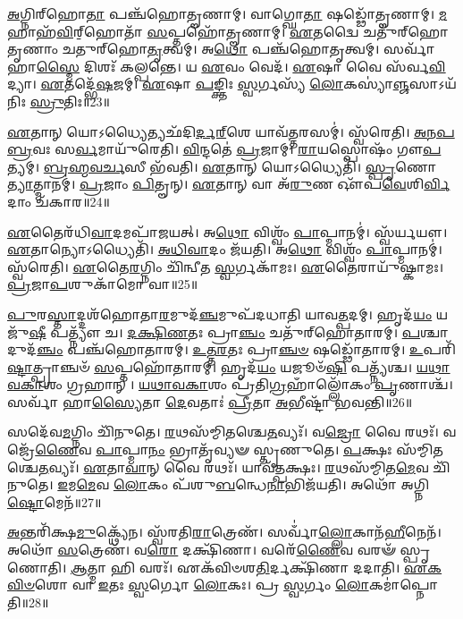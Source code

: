    \ul{𑌅}\-𑌗𑍍𑌨𑌿𑌰𑍍‌𑌹𑍋\-\ul{𑌤𑌾} 𑌪𑌞𑍍𑌚᳴𑌹𑍋𑌤𑍄𑌣𑌾𑌮𑍍।
   𑌵𑌾𑌗𑍍𑌘𑍋\-\ul{𑌤𑌾} 𑌷𑌡𑍍𑌢𑍋᳴𑌤𑍄𑌣𑌾𑌮𑍍।
   \ul{𑌮}\-𑌹𑌾𑌹᳴\-\ul{𑌵𑌿}\-𑌰𑍍‌॒𑌹𑍋𑌤𑌾᳴ \ul{𑌸}\-𑌪𑍍𑌤𑌹𑍋᳴𑌤𑍄𑌣𑌾𑌮𑍍।
   \ul{𑌏}\-𑌤𑌦𑍍𑌵𑍈 𑌚𑌤𑍁᳴𑌰𑍍‌𑌹𑍋𑌤𑍃𑌣𑌾𑌂 𑌚𑌤𑍁𑌰𑍍‌𑌹𑍋\-\ul{𑌤𑍃}\-𑌤𑍍𑌵𑌮𑍍।
   𑌅\-\ul{𑌥𑍋} 𑌪𑌞𑍍𑌚᳴𑌹𑍋𑌤𑍃𑌤𑍍𑌵𑌮𑍍।
   𑌸𑌰𑍍𑌵𑌾᳴ 𑌹𑌾\-\ul{𑌸𑍍𑌮𑍈} 𑌦𑌿𑌶𑌃᳴ 𑌕𑌲𑍍𑌪𑌨𑍍𑌤𑍇।
   𑌯 \ul{𑌏}\-𑌵𑌂 𑌵𑍇𑌦᳴।
   \ul{𑌏}\-𑌷𑌾 𑌵𑍈 𑌸᳴𑌰𑍍𑌵\-\ul{𑌵𑌿}\-𑌦𑍍𑌯𑌾।
   \ul{𑌏}\-𑌤𑌦𑍍𑌭𑍇᳴\-\ul{𑌷}\-𑌜𑌮𑍍।
   \ul{𑌏}\-𑌷𑌾 \ul{𑌪}\-𑌙𑍍𑌕𑍍𑌤𑌿𑌃 \ul{𑌸𑍍𑌵}\-𑌰𑍍𑌗𑌸𑍍𑌯᳴ \ul{𑌲𑍋}\-𑌕𑌸𑍍𑌯𑌾॑\-\ul{𑌞𑍍𑌜}\-𑌸𑌾𑌽𑌯᳴𑌨𑌿𑌃 \ul{𑌸𑍍𑌰𑍁}\-𑌤𑌿𑌃॥23॥

   \ul{𑌏}\-𑌤𑌾𑌨𑍍 𑌯𑍋𑌽𑌧𑍍𑌯𑍈𑌤𑍍𑌯𑌛᳴𑌦𑌿\-\ul{𑌰𑍍𑌦}\-\-\ul{𑌰𑍍}\-‌𑌶𑍇 𑌯𑌾𑌵᳴\-\ul{𑌤𑍍𑌤}\-𑌰𑌸𑌮𑍍॑।
   𑌸𑍍𑌵᳴𑌰𑍇𑌤𑌿।
   \ul{𑌅}\-\-\ul{𑌨}\-\-\ul{𑌪}\-\-\ul{𑌬𑍍𑌰}\-𑌵𑌃 𑌸\-\ul{𑌰𑍍𑌵}\-𑌮𑌾𑌯𑍁᳴𑌰𑍇𑌤𑌿।
   \ul{𑌵𑌿}\-𑌨𑍍𑌦𑌤𑍇॑ \ul{𑌪𑍍𑌰}\-𑌜𑌾𑌮𑍍।
   \ul{𑌰𑌾}\-𑌯𑌸𑍍𑌪𑍋𑌷𑌂᳴ 𑌗𑍗\-\ul{𑌪}\-𑌤𑍍𑌯𑌮𑍍।
   \ul{𑌬𑍍𑌰}\-\-\ul{𑌹𑍍𑌮}\-\-\ul{𑌵}\-\-\ul{𑌰𑍍𑌚}\-𑌸𑍀 𑌭᳴𑌵𑌤𑌿।
   \ul{𑌏}\-𑌤𑌾𑌨𑍍 𑌯𑍋𑌽𑌧𑍍𑌯𑍈𑌤𑌿᳴।
   \ul{𑌸𑍍𑌪𑍃}\-𑌣𑍋\-\ul{𑌤𑍍𑌯𑌾}\-𑌤𑍍𑌮𑌾𑌨𑌮𑍍॑।
   \ul{𑌪𑍍𑌰}\-𑌜𑌾𑌂 \ul{𑌪𑌿}\-𑌤𑍄𑌨𑍍।
   \ul{𑌏}\-𑌤𑌾𑌨𑍍 𑌵𑌾 𑌅᳴\-\ul{𑌰𑍁}\-𑌣 𑌔᳴𑌪\-\ul{𑌵𑍇}\-𑌶𑌿\-\ul{𑌰𑍍𑌵𑌿}\-𑌦𑌾𑌂 𑌚᳴𑌕𑌾𑌰॥24॥

   \ul{𑌏}\-𑌤𑍈𑌰᳴𑌧𑌿\-\ul{𑌵𑌾}\-𑌦𑌮𑌪𑌾᳴𑌜𑌯𑌤𑍍।
   𑌅\-\ul{𑌥𑍋} 𑌵𑌿𑌶𑍍𑌵𑌂᳴ \ul{𑌪𑌾}\-𑌪𑍍𑌮𑌾𑌨𑌮𑍍॑।
   𑌸𑍍𑌵᳴𑌰𑍍𑌯𑌯𑍗।
   \ul{𑌏}\-𑌤𑌾𑌨𑍍𑌯𑍋𑌽𑌧𑍍𑌯𑍈𑌤𑌿᳴।
   \ul{𑌅}\-\-\ul{𑌧𑌿}\-\-\ul{𑌵𑌾}\-𑌦𑌂 𑌜᳴𑌯𑌤𑌿।
   𑌅\-\ul{𑌥𑍋} 𑌵𑌿𑌶𑍍𑌵𑌂᳴ \ul{𑌪𑌾}\-𑌪𑍍𑌮𑌾𑌨𑌮𑍍॑।
   𑌸𑍍𑌵᳴𑌰𑍇𑌤𑌿।
   \ul{𑌏}\-𑌤𑍈\-\ul{𑌰}\-𑌗𑍍𑌨𑌿𑌂 𑌚𑌿᳴𑌨𑍍𑌵𑍀𑌤 \ul{𑌸𑍍𑌵}\-𑌰𑍍𑌗𑌕𑌾᳴𑌮𑌃।
   \ul{𑌏}\-𑌤𑍈𑌰𑌾𑌯𑍁᳴𑌷𑍍𑌕𑌾𑌮𑌃।
   \ul{𑌪𑍍𑌰}\-𑌜𑌾\-\ul{𑌪}\-𑌶𑍁𑌕𑌾᳴𑌮𑍋 𑌵𑌾॥25॥

   \ul{𑌪𑍁}\-𑌰\-\ul{𑌸𑍍𑌤𑌾}\-𑌦𑍍𑌦𑌶᳴𑌹𑍋𑌤𑌾\-\ul{𑌰}\-𑌮𑍁𑌦᳴\-\ul{𑌞𑍍𑌚}\-𑌮𑍁𑌪᳴𑌦𑌧𑌾𑌤𑌿 𑌯𑌾𑌵\-\ul{𑌤𑍍𑌪}\-𑌦𑌮𑍍।
   𑌹𑍃𑌦᳴\-\ul{𑌯𑌂} 𑌯𑌜𑍁᳴\-\ul{𑌷𑍀} 𑌪𑌤𑍍𑌨𑍍𑌯𑍗᳴ 𑌚।
   \ul{𑌦}\-\-\ul{𑌕𑍍𑌷𑌿}\-\-\ul{𑌣}\-𑌤𑌃 𑌪𑍍𑌰𑌾\-\ul{𑌞𑍍𑌚𑌂} 𑌚𑌤𑍁᳴𑌰𑍍‌𑌹𑍋𑌤𑌾𑌰𑌮𑍍।
   \ul{𑌪}\-𑌶𑍍𑌚𑌾𑌦𑍁𑌦᳴\-\ul{𑌞𑍍𑌚𑌂} 𑌪𑌞𑍍𑌚᳴𑌹𑍋𑌤𑌾𑌰𑌮𑍍।
   \ul{𑌉}\-\-\ul{𑌤𑍍𑌤}\-\-\ul{𑌰}\-𑌤𑌃 𑌪𑍍𑌰𑌾\-\ul{𑌞𑍍𑌚}\-\-\ul{𑍞} 𑌷𑌡𑍍𑌢𑍋᳴𑌤𑌾𑌰𑌮𑍍।
   \ul{𑌉}\-𑌪𑌰𑌿᳴\-\ul{𑌷𑍍𑌟𑌾}\-𑌤𑍍𑌪𑍍𑌰𑌾𑌞𑍍𑌚𑍞᳴ \ul{𑌸}\-𑌪𑍍𑌤𑌹𑍋᳴𑌤𑌾𑌰𑌮𑍍।
   𑌹𑍃𑌦᳴\-\ul{𑌯𑌂} 𑌯𑌜𑍂𑍞᳴\-\ul{𑌷𑌿} 𑌪𑌤𑍍𑌨𑍍𑌯᳴𑌶𑍍𑌚।
   \ul{𑌯}\-\-\ul{𑌥𑌾}\-\-\ul{𑌵}\-\-\ul{𑌕𑌾}\-𑌶𑌂 𑌗𑍍𑌰𑌹𑌾𑌨𑍍।
   \ul{𑌯}\-\-\ul{𑌥𑌾}\-\-\ul{𑌵}\-\-\ul{𑌕𑌾}\-𑌶𑌂 𑌪𑍍𑌰᳴𑌤𑌿\-\ul{𑌗𑍍𑌰}\-𑌹𑌾𑌁𑌲𑍍𑌲𑍋᳴𑌕𑌂  \ul{𑌪𑍃}\-𑌣𑌾𑌶𑍍𑌚᳴।
   𑌸𑌰𑍍𑌵𑌾᳴ 𑌹𑌾\-\ul{𑌸𑍍𑌯𑍈}\-𑌤𑌾 \ul{𑌦𑍇}\-𑌵𑌤𑌾𑌃॑ \ul{𑌪𑍍𑌰𑍀}\-𑌤𑌾 \ul{𑌅}\-𑌭𑍀𑌷𑍍𑌟𑌾᳴ 𑌭𑌵𑌨𑍍𑌤𑌿॥26॥

   𑌸𑌦𑍇᳴𑌵\-\ul{𑌮}\-𑌗𑍍𑌨𑌿𑌂 𑌚𑌿᳴𑌨𑍁𑌤𑍇।
   \ul{𑌰}\-𑌥𑌸᳴𑌮𑍍𑌮𑌿𑌤𑌶𑍍𑌚𑍇\-\ul{𑌤}\-𑌵𑍍𑌯𑌃᳴।
   𑌵\-\ul{𑌜𑍍𑌰𑍋} 𑌵𑍈 𑌰𑌥𑌃᳴।
   𑌵𑌜𑍍𑌰𑍇᳴\-\ul{𑌣𑍈}\-𑌵 \ul{𑌪𑌾}\-𑌪𑍍𑌮𑌾\-\ul{𑌨𑌂} 𑌭𑍍𑌰𑌾𑌤𑍃᳴𑌵𑍍𑌯𑍟 𑌸𑍍𑌤𑍃𑌣𑍁𑌤𑍇।
   \ul{𑌪}\-𑌕𑍍𑌷𑌃 𑌸᳴𑌮𑍍𑌮𑌿𑌤𑌶𑍍𑌚𑍇\-\ul{𑌤}\-𑌵𑍍𑌯𑌃᳴।
   \ul{𑌏}\-𑌤𑌾\-\ul{𑌵𑌾}\-𑌨𑍍 𑌵𑍈 𑌰𑌥𑌃᳴।
   𑌯𑌾𑌵᳴\-\ul{𑌤𑍍𑌪}\-𑌕𑍍𑌷𑌃।
   \ul{𑌰}\-𑌥𑌸᳴𑌮𑍍𑌮𑌿𑌤\-\ul{𑌮𑍇}\-𑌵 𑌚𑌿᳴𑌨𑍁𑌤𑍇।
   \ul{𑌇}\-𑌮\-\ul{𑌮𑍇}\-𑌵 \ul{𑌲𑍋}\-𑌕𑌂 𑌪᳴𑌶𑍁\-\ul{𑌬}\-𑌨𑍍𑌧𑍇\-\ul{𑌨𑌾}\-𑌭𑌿𑌜᳴𑌯𑌤𑌿।
   𑌅𑌥𑍋᳴ 𑌅𑌗𑍍𑌨𑌿\-\ul{𑌷𑍍𑌟𑍋}\-𑌮𑍇𑌨᳴॥27॥

   \ul{𑌅}\-𑌨𑍍𑌤𑌰𑌿᳴𑌕𑍍𑌷\-\ul{𑌮𑍁}\-𑌕𑍍𑌥𑍍𑌯𑍇᳴𑌨।
   𑌸𑍍𑌵᳴𑌰𑌤𑌿\-\ul{𑌰𑌾}\-𑌤𑍍𑌰𑍇𑌣᳴।
   𑌸𑌰𑍍𑌵𑌾𑌁॑\-\ul{𑌲𑍍𑌲𑍋}\-𑌕𑌾𑌨᳴\-\ul{𑌹𑍀}\-𑌨𑍇𑌨᳴।
   𑌅𑌥𑍋᳴ \ul{𑌸}\-𑌤𑍍𑌰𑍇𑌣᳴।
   𑌵\-\ul{𑌰𑍋} 𑌦𑌕𑍍𑌷𑌿᳴𑌣𑌾।
   𑌵𑌰𑍇᳴\-\ul{𑌣𑍈}\-𑌵 𑌵𑌰𑍟᳴ 𑌸𑍍𑌪𑍃𑌣𑍋𑌤𑌿।
   \ul{𑌆}\-𑌤𑍍𑌮𑌾 𑌹𑌿 𑌵𑌰𑌃᳴।
   𑌏𑌕᳴𑌵𑌿𑍞𑌶\-\ul{𑌤𑌿}\-𑌰𑍍𑌦𑌕𑍍𑌷𑌿᳴𑌣𑌾 𑌦𑌦𑌾𑌤𑌿।
   \ul{𑌏}\-\-\ul{𑌕}\-\-\ul{𑌵𑌿}\-\-\ul{𑍞}\-𑌶𑍋 𑌵𑌾 \ul{𑌇}\-𑌤𑌃 \ul{𑌸𑍍𑌵}\-𑌰𑍍𑌗𑍋 \ul{𑌲𑍋}\-𑌕𑌃।
   𑌪𑍍𑌰 \ul{𑌸𑍍𑌵}\-𑌰𑍍𑌗𑌂 \ul{𑌲𑍋}\-𑌕𑌮𑌾॑𑌪𑍍𑌨𑍋𑌤𑌿॥28॥

